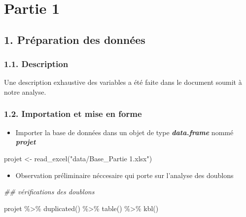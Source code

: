 \documentclass[
  letterpaper,
  DIV=11,
  numbers=noendperiod]{scrartcl}
\newenvironment{Shaded}{\begin{snugshade}}{\end{snugshade}}
\newcommand{\DocumentationTok}[1]{\textcolor[rgb]{0.37,0.37,0.37}{\textit{#1}}}
\newcommand{\FunctionTok}[1]{\textcolor[rgb]{0.28,0.35,0.67}{#1}}
\newcommand{\NormalTok}[1]{\textcolor[rgb]{0.00,0.23,0.31}{#1}}
\newcommand{\OtherTok}[1]{\textcolor[rgb]{0.00,0.23,0.31}{#1}}
\newcommand{\SpecialCharTok}[1]{\textcolor[rgb]{0.37,0.37,0.37}{#1}}
\newcommand{\StringTok}[1]{\textcolor[rgb]{0.13,0.47,0.30}{#1}}
\providecommand{\tightlist}{%
  \setlength{\itemsep}{0pt}\setlength{\parskip}{0pt}}\usepackage{longtable,booktabs,array}
\begin{document}
\hypertarget{partie-1}{%
\section{Partie 1}\label{partie-1}}

\hypertarget{pruxe9paration-des-donnuxe9es}{%
\subsection{1. Préparation des
données}\label{pruxe9paration-des-donnuxe9es}}

\hypertarget{description}{%
\subsubsection{1.1. Description}\label{description}}

Une description exhaustive des variables a été faite dans le document
soumit à notre analyse.

\hypertarget{importation-et-mise-en-forme}{%
\subsubsection{1.2. Importation et mise en
forme}\label{importation-et-mise-en-forme}}

\begin{itemize}
\tightlist
\item
  Importer la base de données dans un objet de type
  \textbf{\emph{data.frame}} nommé \textbf{\emph{projet}}
\end{itemize}

\begin{Shaded}
\begin{Highlighting}[]
\NormalTok{projet }\OtherTok{\textless{}{-}} \FunctionTok{read\_excel}\NormalTok{(}\StringTok{"data/Base\_Partie 1.xlsx"}\NormalTok{)}
\end{Highlighting}
\end{Shaded}

\begin{itemize}
\tightlist
\item
  Observation préliminaire néccesaire qui porte sur l'analyse des
  doublons
\end{itemize}

\begin{Shaded}
\begin{Highlighting}[]
\DocumentationTok{\#\# vérifications des doublons}

\NormalTok{projet }\SpecialCharTok{\%\textgreater{}\%} 
  \FunctionTok{duplicated}\NormalTok{() }\SpecialCharTok{\%\textgreater{}\%} 
    \FunctionTok{table}\NormalTok{() }\SpecialCharTok{\%\textgreater{}\%}
       \FunctionTok{kbl}\NormalTok{()}
\end{Highlighting}
\end{Shaded}
\end{document}
